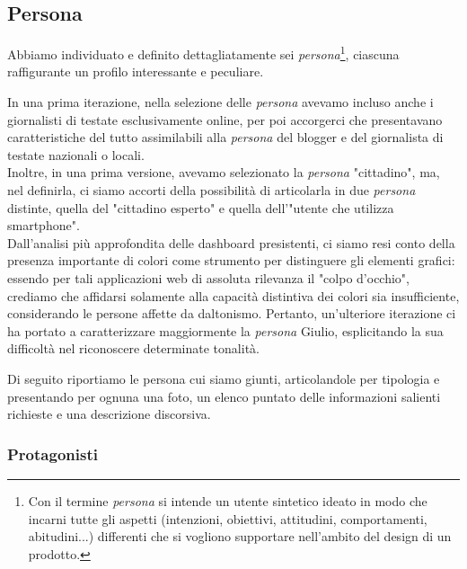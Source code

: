 \subsection{Persona}
Abbiamo individuato e definito dettagliatamente sei \textit{persona}\footnote{Con il termine \textit{persona} si intende un utente sintetico ideato in modo che incarni tutte gli aspetti (intenzioni, obiettivi, attitudini, comportamenti, abitudini...) differenti che si vogliono supportare nell'ambito del design di un prodotto.}, ciascuna raffigurante un profilo interessante e peculiare. 

In una prima iterazione, nella selezione delle \textit{persona} avevamo incluso anche i giornalisti di testate esclusivamente online, per poi accorgerci che presentavano caratteristiche del tutto assimilabili alla \textit{persona} del blogger e del giornalista di testate nazionali o locali. \\ 
Inoltre, in una prima versione, avevamo selezionato la \textit{persona} "cittadino", ma, nel definirla, ci siamo accorti della possibilità di articolarla in due \textit{persona} distinte, quella del "cittadino esperto" e quella dell'"utente che utilizza smartphone".\\
Dall'analisi più approfondita delle dashboard presistenti, ci siamo resi conto della presenza importante di colori come strumento per distinguere gli elementi grafici: essendo per tali applicazioni web di assoluta rilevanza il "colpo d'occhio", crediamo che affidarsi solamente alla capacità distintiva dei colori sia insufficiente, considerando le persone affette da daltonismo. Pertanto, un'ulteriore iterazione ci ha portato a caratterizzare maggiormente la \textit{persona} Giulio, esplicitando la sua difficoltà nel riconoscere determinate tonalità.

Di seguito riportiamo le persona cui siamo giunti, articolandole per tipologia e presentando per ognuna una foto, un elenco puntato delle informazioni salienti richieste e una descrizione discorsiva.

\subsubsection{Protagonisti}

